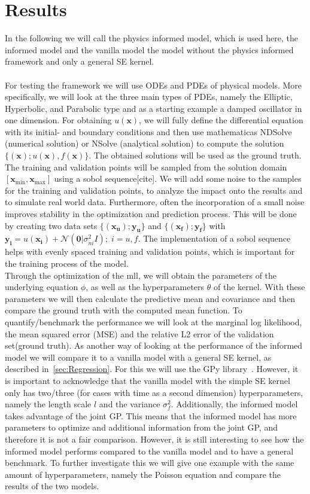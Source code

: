 \documentclass{article}
\begin{document}
\section{Results}
In the following we will call the physics informed model, which is used here, the
informed model and the vanilla model the model without the physics informed
framework and only a general SE kernel.\\ \\ For testing the framework we will
use ODEs and PDEs of physical models. More specifically, we will look at the
three main types of PDEs, namely the Elliptic, Hyperbolic, and Parabolic type and as a starting example a damped oscillator in one dimension. For obtaining
$u(\bm{x})$, we will fully define the differential equation with its initial-
and boundary conditions and then use mathematicas NDSolve (numerical solution)
or NSolve (analytical solution) to compute the solution
$\{(\bm{x});u(\bm{x}),f(\bm{x})\}$. The obtained solutions will be used as the ground truth.
The training and validation points will be sampled from the solution domain $[\bm{x}_{\min}, \bm{x}_{\max}]$ using a sobol
sequence[cite]. We will add some noise to the samples for the training and
validation points, to analyze the impact onto the results and to simulate real
world data. Furthermore, often the incorporation of a small noise improves stability in
the optimization and prediction process. This will be done by creating two data
sets $\{(\bm{x_u});\bm{y_u}\}$ and $\{(\bm{x_f});\bm{y_f}\}$ with $\bm{y_i} =
    u(\bm{x_i}) + \mathcal{N}(\bm{0}|\sigma_{ni}^2 I) ; \; i = u,f$. The
implementation of a sobol sequence helps with evenly spaced training and
validation points, which is important for the training process of the model.\\
Through the optimization of the mll, we will obtain the parameters of the
underlying equation $\phi$, as well as the hyperparameters $\theta$ of the
kernel. With these parameters we will then calculate the predictive mean and
covariance and then compare the ground truth with the computed mean function.
To quantify/benchmark the performance we will look at the marginal log likelihood, the mean squared error (MSE) and the relative L2 error of the validation set(ground truth). As another
way of looking at the performance of the informed model we will compare it to a
vanilla model with a general SE kernel, as described in~\ref{sec:Regression}.
For this we will use the GPy library~\cite{gpy2014}. However, it is important
to acknowledge that the vanilla model with the simple SE kernel only has two/three (for cases with time as a second dimension) hyperparameters, namely the length scale $l$ and the variance $\sigma_f^2$.
Additionally, the informed model takes advantage of the joint GP. This means
that the informed model has more parameters to optimize and additional
information from the joint GP, and therefore it is not a fair comparison.
However, it is still interesting to see how the informed model performs
compared to the vanilla model and to have a general benchmark. To further
investigate this we will give one example with the same amount of
hyperparameters, namely the Poisson equation and compare the results of the two
models.\\
\end{document}
